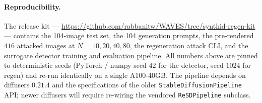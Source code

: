 \documentclass[11pt]{article}
\begin{document}
\paragraph{Reproducibility.}
The release kit ---
\url{https://github.com/rabbanitw/WAVES/tree/synthid-regen-kit} ---
contains the 104-image test set, the 104 generation prompts, the
pre-rendered $416$ attacked images at $N{=}10,20,40,80$, the regeneration
attack CLI, and the surrogate detector training and evaluation pipeline.
All numbers above are pinned to deterministic seeds (PyTorch / numpy
seed $42$ for the detector, seed $1024$ for regen) and re-run identically
on a single A100-40GB. The pipeline depends on diffusers $0.21.4$ and the
specifications of the older \texttt{StableDiffusionPipeline} API; newer
diffusers will require re-wiring the vendored \texttt{ReSDPipeline}
subclass.



\end{document}
